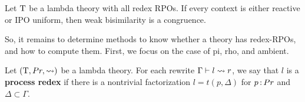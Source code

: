\documentclass{article}
\begin{document}
\begin{theorem}
    Let $\mathrm{T}$ be a lambda theory with all redex RPOs. If every context is either reactive or IPO uniform, then weak bisimilarity is a congruence.
\end{theorem}



\newpage

So, it remains to determine methods to know whether a theory has redex-RPOs, and how to compute them. First, we focus on the case of pi, rho, and ambient.

\begin{definition}
    Let $(\mathrm{T},Pr,\rightsquigarrow)$ be a lambda theory. For each rewrite $\Gamma\vdash l\rightsquigarrow r$, we say that $l$ is a \textbf{process redex} if there is a nontrivial factorization $l = t(p,\Delta)$ for $p\,{:}\, Pr$ and $\Delta\subset \Gamma$.
\end{definition}
\end{document}
